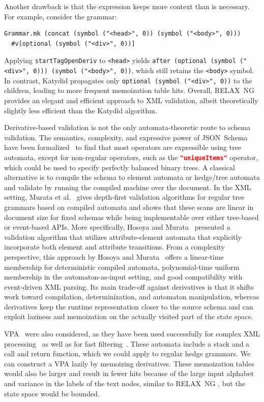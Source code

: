 \documentclass[runningheads]{llncs}
\newcommand{\RelaxNG}{%
  RELAX~NG\xspace%
}
\newcommand{\JSONSchema}{%
  JSON~Schema\xspace%
}
\newcommand{\uniqueItems}{%
  \lstinline[language=json]|"uniqueItems"|\xspace%
}
\newcommand{\VPA}{\ac{VPA}\xspace}
\newcommand{\XML}{\ac{XML}\xspace}
\begin{document}
Another drawback is that the expression keeps more context than is necessary.
For example, consider the grammar:
\begin{lstlisting}
Grammar.mk (concat (symbol ("<head>", 0)) (symbol ("<body>", 0)))
  #v[optional (symbol ("<div>", 0))]
\end{lstlisting}
Applying \lstinline{startTagOpenDeriv} to \lstinline{<head>} yields \lstinline{after (optional (symbol ("<div>", 0))) (symbol ("<body>", 0))}, which still retains the \lstinline{<body>} symbol.
In contrast, Katydid propagates only \lstinline{optional (symbol ("<div>", 0))} to the children, leading to more frequent memoization table hits.
Overall, \RelaxNG provides an elegant and efficient approach to \XML validation, albeit theoretically slightly less efficient than the Katydid algorithm.

Derivative-based validation is not the only automata-theoretic route to schema validation. 
The semantics, complexity, and expressive power of \JSONSchema have been formalized~\cite{jsonschemafoundations} to find that most operators are expressible using tree automata, except for non-regular operators, such as the \uniqueItems operator, which could be used to specify perfectly balanced binary trees.
A classical alternative is to compile the schema to element automata or hedge/tree automata and validate by running the compiled machine over the document. 
In the \XML setting, Murata et al.~\cite{murata2005taxonomy} gives depth-first validation algorithms for regular tree grammars based on compiled automata and shows that these scans are linear in document size for fixed schemas while being implementable over either tree-based or event-based APIs. 
More specifically, Hosoya and Murata~\cite{hosoya2002validation} presented a validation algorithm that utilizes attribute-element automata that explicitly incorporate both element and attribute transitions. 
From a complexity perspective, this approach by Hosoya and Murata~\cite{hosoya2002validation} offers a linear-time membership for deterministic compiled automata, polynomial-time uniform membership in the automaton-as-input setting, and good compatibility with event-driven \XML parsing. 
Its main trade-off against derivatives is that it shifts work toward compilation, determinization, and automaton manipulation, whereas derivatives keep the runtime representation closer to the source schema and can exploit laziness and memoization on the actually visited part of the state space.

\VPA~\cite{alur2004visibly} were also considered, as they have been used successfully for complex \XML processing~\cite{mozafari2012high} as well as for fast filtering~\cite{kumar2007visibly}.
These automata include a stack and a call and return function, which we could apply to regular hedge grammars.
We can construct a \VPA lazily by memoizing derivatives.
These memoization tables would also be larger and result in fewer hits because of the large input alphabet and variance in the labels of the text nodes, similar to \RelaxNG, but the state space would be bounded.
\end{document}
